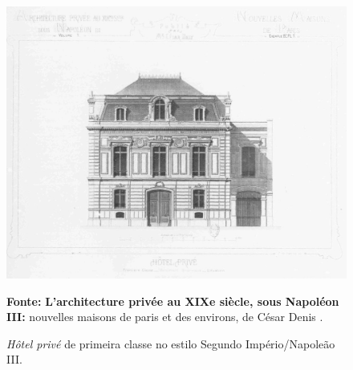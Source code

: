 
\begin{figure}[!htp]
\centering
\caption{\textit{Hôtel privé} de primeira classe no estilo Segundo Império/Napoleão III.}
\includegraphics[width=1\textwidth]{2-cap1/complementos/fotos/daly01-0.JPEG}{\par \footnotesize \textbf{Fonte:} \textbf{L’architecture privée au XIXe siècle, sous Napoléon III:} nouvelles maisons de paris et des environs, de César Denis . \par}
\label{fig:hotelprimclas} 
\end{figure}

